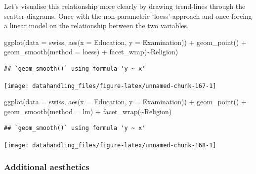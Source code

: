 \documentclass[
  12pt,
]{style/krantz}
\newenvironment{Shaded}{\begin{snugshade}}{\end{snugshade}}
\newcommand{\AttributeTok}[1]{\textcolor[rgb]{0.77,0.63,0.00}{#1}}
\newcommand{\FunctionTok}[1]{\textcolor[rgb]{0.00,0.00,0.00}{#1}}
\newcommand{\NormalTok}[1]{#1}
\newcommand{\SpecialCharTok}[1]{\textcolor[rgb]{0.00,0.00,0.00}{#1}}
\newcommand{\StringTok}[1]{\textcolor[rgb]{0.31,0.60,0.02}{#1}}
\begin{document}
Let's visualise this relationship more clearly by drawing trend-lines through the scatter diagrams. Once with the non-parametric `loess'-approach and once forcing a linear model on the relationship between the two variables.

\begin{Shaded}
\begin{Highlighting}[]
\FunctionTok{ggplot}\NormalTok{(}\AttributeTok{data =}\NormalTok{ swiss, }\FunctionTok{aes}\NormalTok{(}\AttributeTok{x =}\NormalTok{ Education, }\AttributeTok{y =}\NormalTok{ Examination)) }\SpecialCharTok{+} 
     \FunctionTok{geom\_point}\NormalTok{() }\SpecialCharTok{+}
     \FunctionTok{geom\_smooth}\NormalTok{(}\AttributeTok{method =} \StringTok{\textquotesingle{}loess\textquotesingle{}}\NormalTok{) }\SpecialCharTok{+}
     \FunctionTok{facet\_wrap}\NormalTok{(}\SpecialCharTok{\textasciitilde{}}\NormalTok{Religion)}
\end{Highlighting}
\end{Shaded}

\begin{verbatim}
## `geom_smooth()` using formula 'y ~ x'
\end{verbatim}

\texttt{[image: datahandling\_files/figure-latex/unnamed-chunk-167-1]}

\begin{Shaded}
\begin{Highlighting}[]
\FunctionTok{ggplot}\NormalTok{(}\AttributeTok{data =}\NormalTok{ swiss, }\FunctionTok{aes}\NormalTok{(}\AttributeTok{x =}\NormalTok{ Education, }\AttributeTok{y =}\NormalTok{ Examination)) }\SpecialCharTok{+} 
     \FunctionTok{geom\_point}\NormalTok{() }\SpecialCharTok{+}
     \FunctionTok{geom\_smooth}\NormalTok{(}\AttributeTok{method =} \StringTok{\textquotesingle{}lm\textquotesingle{}}\NormalTok{) }\SpecialCharTok{+}
     \FunctionTok{facet\_wrap}\NormalTok{(}\SpecialCharTok{\textasciitilde{}}\NormalTok{Religion)}
\end{Highlighting}
\end{Shaded}

\begin{verbatim}
## `geom_smooth()` using formula 'y ~ x'
\end{verbatim}

\texttt{[image: datahandling\_files/figure-latex/unnamed-chunk-168-1]}

\hypertarget{additional-aesthetics}{%
\subsubsection{Additional aesthetics}\label{additional-aesthetics}}
\end{document}
